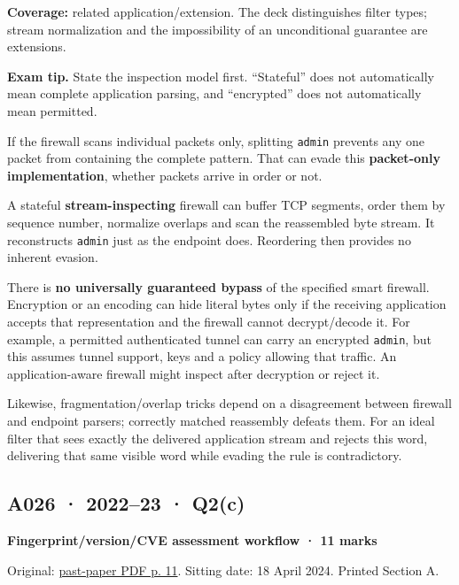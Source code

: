 \documentclass[11pt,a4paper]{article}
\begin{document}
\textbf{Coverage:} related application/\allowbreak{}extension. The deck distinguishes filter types; stream normalization and the impossibility of an unconditional guarantee are extensions.



{\color{ForestGreen}\textbf{Exam tip.} State the inspection model first. “Stateful” does not automatically mean complete application parsing,\allowbreak{} and “encrypted” does not automatically mean permitted.}


If the firewall scans individual packets only,\allowbreak{} splitting \texttt{admin} prevents any one packet from containing the complete pattern. That can evade this \textbf{packet-only implementation},\allowbreak{} whether packets arrive in order or not.


A stateful \textbf{stream-inspecting} firewall can buffer TCP segments,\allowbreak{} order them by sequence number,\allowbreak{} normalize overlaps and scan the reassembled byte stream. It reconstructs \texttt{admin} just as the endpoint does. Reordering then provides no inherent evasion.


There is \textbf{no universally guaranteed bypass} of the specified smart firewall. Encryption or an encoding can hide literal bytes only if the receiving application accepts that representation and the firewall cannot decrypt/\allowbreak{}decode it. For example,\allowbreak{} a permitted authenticated tunnel can carry an encrypted \texttt{admin},\allowbreak{} but this assumes tunnel support,\allowbreak{} keys and a policy allowing that traffic. An application-aware firewall might inspect after decryption or reject it.


Likewise,\allowbreak{} fragmentation/\allowbreak{}overlap tricks depend on a disagreement between firewall and endpoint parsers; correctly matched reassembly defeats them. For an ideal filter that sees exactly the delivered application stream and rejects this word,\allowbreak{} delivering that same visible word while evading the rule is contradictory.




\clearpage
\subsection{A026 · 2022–23 · Q2(c)}\label{a026}

\textbf{Fingerprint/\allowbreak{}version/\allowbreak{}CVE assessment workflow · 11 marks}


Original: \href{../../CSE405-Security_Merged.pdf\#page=11}{past-paper PDF p. 11}. Sitting date: 18 April 2024. Printed Section A.
\end{document}
